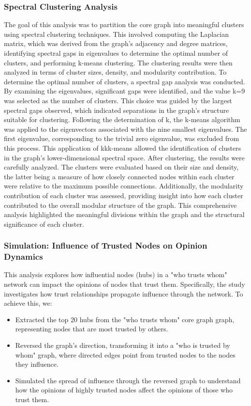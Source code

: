 \documentclass[conference]{IEEEtran}
\begin{document}
\subsubsection{Spectral Clustering Analysis}
The goal of this analysis was to partition the core graph into meaningful clusters using spectral clustering techniques. This involved computing the Laplacian matrix, which was derived from the graph's adjacency and degree matrices, identifying spectral gaps in eigenvalues to determine the optimal number of clusters, and performing k-means clustering. The clustering results were then analyzed in terms of cluster sizes, density, and modularity contribution. 
To determine the optimal number of clusters, a spectral gap analysis was conducted. By examining the eigenvalues, significant gaps were identified, and the value k=9 was selected as the number of clusters. This choice was guided by the largest spectral gaps observed, which indicated separations in the graph's structure suitable for clustering.
Following the determination of k, the k-means algorithm was applied to the eigenvectors associated with the nine smallest eigenvalues. The first eigenvalue, corresponding to the trivial zero eigenvalue, was excluded from this process. This application of kkk-means allowed the identification of clusters in the graph's lower-dimensional spectral space.
After clustering, the results were carefully analyzed. The clusters were evaluated based on their size and density, the latter being a measure of how closely connected nodes within each cluster were relative to the maximum possible connections. Additionally, the modularity contribution of each cluster was assessed, providing insight into how each cluster contributed to the overall modular structure of the graph. This comprehensive analysis highlighted the meaningful divisions within the graph and the structural significance of each cluster.

\subsubsection{Simulation: Influence of Trusted Nodes on Opinion Dynamics}
This analysis explores how influential nodes (hubs) in a "who trusts whom" network can impact the opinions of nodes that trust them. Specifically, the study investigates how trust relationships propagate influence through the network. To achieve this, we:

\begin{itemize}
    \item Extracted the top 20 hubs from the "who trusts whom" core graph graph, representing nodes that are most trusted by others.
    \item Reversed the graph's direction, transforming it into a "who is trusted by whom" graph, where directed edges point from trusted nodes to the nodes they influence.
    \item Simulated the spread of influence through the reversed graph to understand how the opinions of highly trusted nodes affect the opinions of those who trust them.
\end{itemize}
\end{document}
